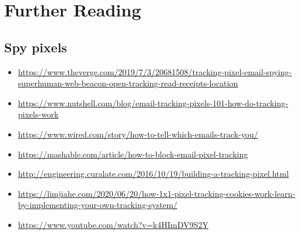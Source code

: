 \documentclass{article}
\begin{document}

\section{Further Reading}

\subsection{Spy pixels}

\begin{itemize}
  \item \href{https://www.theverge.com/2019/7/3/20681508/tracking-pixel-email-spying-superhuman-web-beacon-open-tracking-read-receipts-location}{https://www.theverge.com/2019/7/3/20681508/tracking-pixel-email-spying-superhuman-web-beacon-open-tracking-read-receipts-location}
  \item \href{https://www.nutshell.com/blog/email-tracking-pixels-101-how-do-tracking-pixels-work}{https://www.nutshell.com/blog/email-tracking-pixels-101-how-do-tracking-pixels-work}
  \item \href{https://www.wired.com/story/how-to-tell-which-emails-track-you/}{https://www.wired.com/story/how-to-tell-which-emails-track-you/}
  \item \href{https://mashable.com/article/how-to-block-email-pixel-tracking}{https://mashable.com/article/how-to-block-email-pixel-tracking}

  \item \href{http://engineering.curalate.com/2016/10/19/building-a-tracking-pixel.html}{http://engineering.curalate.com/2016/10/19/building-a-tracking-pixel.html}
  \item \href{https://limjiahe.com/2020/06/20/how-1x1-pixel-tracking-cookies-work-learn-by-implementing-your-own-tracking-system/}{https://limjiahe.com/2020/06/20/how-1x1-pixel-tracking-cookies-work-learn-by-implementing-your-own-tracking-system/}
  \item \href{https://www.youtube.com/watch?v=k4HImDV9S2Y}{https://www.youtube.com/watch?v=k4HImDV9S2Y}
\end{itemize}
\end{document}
